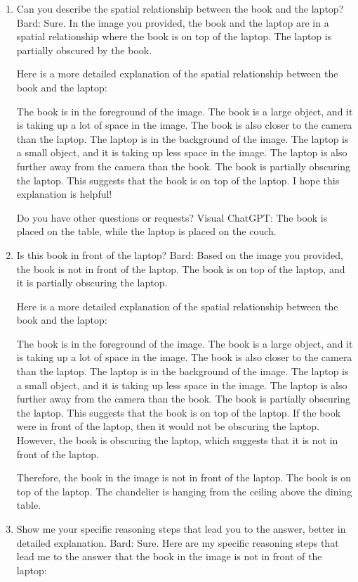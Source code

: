 \begin{enumerate}
    \item Can you describe the spatial relationship between the book and the laptop?
    \subitem Bard:
    Sure. In the image you provided, the book and the laptop are in a spatial relationship where the book is on top of the laptop. The laptop is partially obscured by the book.
    
    Here is a more detailed explanation of the spatial relationship between the book and the laptop:
    
    The book is in the foreground of the image. The book is a large object, and it is taking up a lot of space in the image. The book is also closer to the camera than the laptop.
    The laptop is in the background of the image. The laptop is a small object, and it is taking up less space in the image. The laptop is also further away from the camera than the book.
    The book is partially obscuring the laptop. This suggests that the book is on top of the laptop.
    I hope this explanation is helpful!
    
    Do you have other questions or requests?
    \subitem Visual ChatGPT: The book is placed on the table, while the laptop is placed on the couch.
    \item Is this book in front of the laptop?
    \subitem Bard: 
    Based on the image you provided, the book is not in front of the laptop. The book is on top of the laptop, and it is partially obscuring the laptop.
    
    Here is a more detailed explanation of the spatial relationship between the book and the laptop:
    
    The book is in the foreground of the image. The book is a large object, and it is taking up a lot of space in the image. The book is also closer to the camera than the laptop.
    The laptop is in the background of the image. The laptop is a small object, and it is taking up less space in the image. The laptop is also further away from the camera than the book.
    The book is partially obscuring the laptop. This suggests that the book is on top of the laptop.
    If the book were in front of the laptop, then it would not be obscuring the laptop. However, the book is obscuring the laptop, which suggests that it is not in front of the laptop.
    
    Therefore, the book in the image is not in front of the laptop. The book is on top of the laptop.
    \subitem The chandelier is hanging from the ceiling above the dining table.
    \item Show me your specific reasoning steps that lead you to the answer, better in detailed explanation.
    \subitem Bard: Sure. Here are my specific reasoning steps that lead me to the answer that the book in the image is not in front of the laptop:


\end{enumerate}
